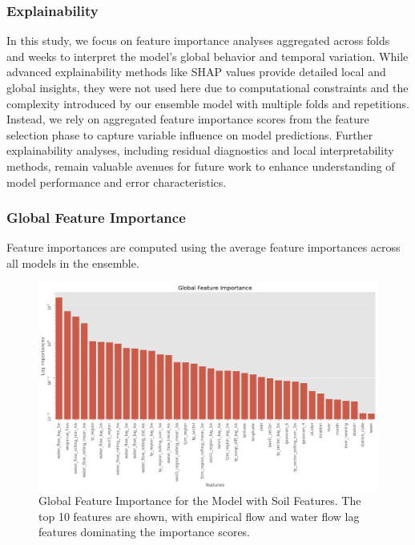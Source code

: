 \documentclass[ruler]{CUP-JNL-EDS}%
\begin{document}
\subsubsection{Explainability}
In this study, we focus on feature importance analyses aggregated across folds and weeks to interpret the model’s global behavior and temporal variation. While advanced explainability methods like SHAP values provide detailed local and global insights, they were not used here due to computational constraints and the complexity introduced by our ensemble model with multiple folds and repetitions.
\\
\noindent Instead, we rely on aggregated feature importance scores from the feature selection phase to capture variable influence on model predictions. Further explainability analyses, including residual diagnostics and local interpretability methods, remain valuable avenues for future work to enhance understanding of model performance and error characteristics.

\subsubsection*{Global Feature Importance}
Feature importances are computed using the average feature importances across all models in the ensemble.
\begin{figure}[ht]
\centering  
\includegraphics[width=1.0\textwidth]{./assets/images/global_feature_importance.png}
\caption{Global Feature Importance for the Model with Soil Features. The top 10 features are shown, with empirical flow and water flow lag features dominating the importance scores.}
\label{fig:global_feature_importance}
\end{figure}
\end{document}

